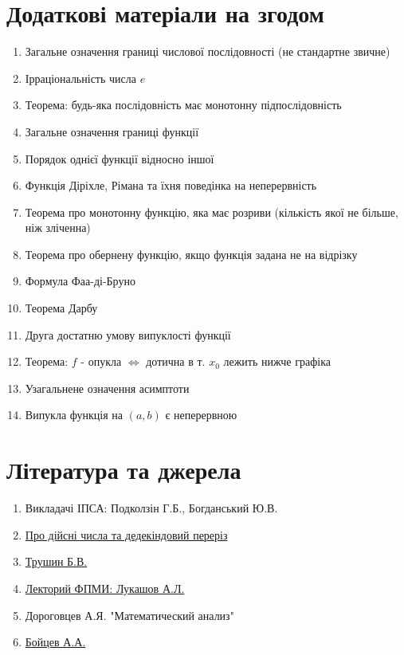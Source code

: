 \documentclass[a4paper, 14pt]{article}
\theoremstyle{theoremdd}
\theoremstyle{theoremdd}
\theoremstyle{theoremdd}
\theoremstyle{theoremdd}
\theoremstyle{theoremdd}
\theoremstyle{theoremdd}
\theoremstyle{theoremdd}
\theoremstyle{theoremdd}
\begin{document}
\section*{Додаткові матеріали на згодом}
\begin{enumerate}
\item Загальне означення границі числової послідовності (не стандартне звичне)
\item Ірраціональність числа $e$
\item Теорема: будь-яка послідовність має монотонну підпослідовність
\item Загальне означення границі функції
\item Порядок однієї функції відносно іншої
\item Функція Діріхле, Рімана та їхня поведінка на неперервність
\item Теорема про монотонну функцію, яка має розриви (кількість якої не більше, ніж зліченна)
\item Теорема про обернену функцію, якщо функція задана не на відрізку
\item Формула Фаа-ді-Бруно
\item Теорема Дарбу
\item Друга достатню умову випуклості функції
\item Теорема: $f$ - опукла $\iff$ дотична в т. $x_0$ лежить нижче графіка
\item Узагальнене означення асимптоти
\item Випукла функція на $(a,b)$ є неперервною
\end{enumerate}

\section*{Література та джерела}
\begin{enumerate}
\item Викладачі ІПСА: Подколзін Г.Б., Богданський Ю.В.
\item \href{https://www.math.brown.edu/reschwar/INF/handout3.pdf}{Про дійсні числа та дедекіндовий переріз}
\item \href{https://www.youtube.com/watch?v=6hwENpQqKP0&list=PL3BJnp-dNqazNc11qgguXNcJwCMqwK5Yv}{Трушин Б.В.}
\item \href{https://www.youtube.com/watch?v=SNq-NgYcqbY&list=PL4_hYwCyhAvZcIIZvqdQyyWx6naPeuj2W}{Лекторий ФПМИ: Лукашов А.Л.}
\item Дороговцев А.Я. "Математический анализ"
\item \href{https://www.youtube.com/watch?v=uOeZbCy6-xc&list=PLx5jwZiVE4CV0zwaZNJeL-m994o7eFbT2&index=1}{Бойцев А.А.}
\end{enumerate}
\end{document}
